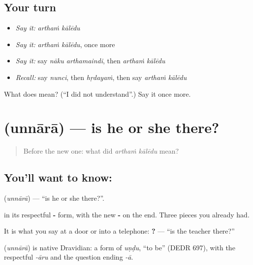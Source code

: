 \subsection*{Your turn}
\begin{itemize}
\raggedright
  \item \emph{Say it:} \emph{arthaṁ kālēdu}
  \item \emph{Say it:} \emph{arthaṁ kālēdu}, once more
  \item \emph{Say it:} say \emph{nāku arthamaindi}, then \emph{arthaṁ kālēdu}
  \item \emph{Recall:} say \emph{nunci}, then \emph{hṛdayaṁ}, then say \emph{arthaṁ kālēdu}
\end{itemize}

\begin{tcolorbox}[breakable,colback=teal!4,colframe=teal!35!black,title={Before you move on}]
What does   mean? (\textquotedblleft{}I did not understand\textquotedblright{}.) Say it once more.
\end{tcolorbox}
\section[\texorpdfstring{\te{ఉన్నారా} (unnārā)}{ఉన్నారా (unnārā)}]{ (unnārā) — is he or she there?}

\label{lesson:TE-C78-isthere}



\begin{quote}
Before the new one: what did \emph{arthaṁ kālēdu} mean?
\end{quote}

\subsection*{You'll want to know: }
\textbf{} (\emph{unnārā}) — \textquotedblleft{}is he or she there?\textquotedblright{}.

 in its respectful \textbf{-} form, with the new \textbf{-} on the end. Three pieces you already had.

It is what you say at a door or into a telephone: \textbf{ ?} — \textquotedblleft{}is the teacher there?\textquotedblright{}

\begin{cousinweb}
\textbf{} (\emph{unnārā}) is native Dravidian: a form of \emph{uṇḍu}, \textquotedblleft{}to be\textquotedblright{} (DEDR 697), with the respectful \emph{-āru} and the question ending \emph{-ā}.
\end{cousinweb}

